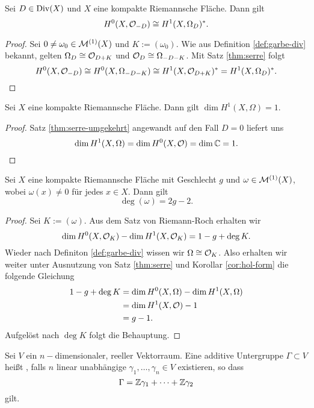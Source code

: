 \begin{thm}
  \label{thm:serre-umgekehrt}
  Sei $D \in \operatorname{Div}(X)$ und $X$ eine kompakte Riemannsche Fläche. Dann
  gilt
  \[
  H^0(X, \mathcal{O}_{-D}) \cong H^1(X, \Omega_D)^\ast.
  \]
\end{thm}

\begin{proof}
  Sei $0 \neq \omega_0 \in \mathcal{M}^{(1)}(X)$ und $K := (\omega_0)$. Wie
  aus Definition \ref{def:garbe-div} bekannt, gelten $\Omega_D \cong
  \mathcal{O}_{D+K}$ und $\mathcal{O}_D \cong \Omega_{-D-K}$. Mit Satz
  \ref{thm:serre} folgt
  \[
  H^0(X, \mathcal{O}_{-D}) \cong H^0(X, \Omega_{-D-K}) \cong H^1(X,
  \mathcal{O}_{D+K})^\ast = H^1(X, \Omega_D)^\ast.
  \]
\end{proof}

\begin{cor}
  \label{cor:hol-form}
  Sei $X$ eine kompakte Riemannsche Fläche. Dann gilt $\dim H^1(X,
  \Omega) = 1$.
\end{cor}

\begin{proof}
  Satz \ref{thm:serre-umgekehrt} angewandt auf den Fall $D = 0$
  liefert uns
  \[
  \dim H^1(X, \Omega) = \dim H^0(X, \mathcal{O}) = \dim \mathbb{C} = 1.
  \]
\end{proof}

\begin{thm}
  \label{thm:deg-geschlecht}
  Sei $X$ eine kompakte Riemannsche Fläche mit Geschlecht $g$ und $\omega
  \in \mathcal{M}^{(1)}(X)$, wobei $\omega(x) \neq 0$ für jedes $x \in
  X$. Dann gilt
  \[
  \deg(\omega) = 2g - 2.
  \]
\end{thm}

\begin{proof}
  Sei $K := (\omega)$. Aus dem Satz von Riemann-Roch erhalten wir
  \[
  \dim H^0(X, \mathcal{O}_K) - \dim H^1(X, \mathcal{O}_K) = 1 - g + \deg K.
  \]
  Wieder nach Definiton \ref{def:garbe-div} wissen wir $\Omega \cong
  \mathcal{O}_K$. Also erhalten wir weiter unter Ausnutzung von Satz
  \ref{thm:serre} und Korollar \ref{cor:hol-form} die folgende Gleichung
  \begin{align*}
    1 - g+ \deg K & = \dim H^0(X, \Omega) - \dim H^1(X, \Omega) \\
    & = \dim H^1(X, \mathcal{O}) - 1 \\
    & = g - 1.
  \end{align*}
  Aufgelöst nach $\deg K$ folgt die Behauptung.
\end{proof}

\begin{defin}
  \label{defin:gitter}
  Sei $V$ ein $n-$dimensionaler, reeller Vektorraum. Eine additive
  Untergruppe $\Gamma \subset V$ heißt , falls $n$ linear
  unabhängige $\gamma_1, \dots, \gamma_n \in V$ existieren, so dass
  \[
  \Gamma = \mathbb{Z} \gamma_1 + \dots + \mathbb{Z} \gamma_2
  \]
  gilt.
\end{defin}

